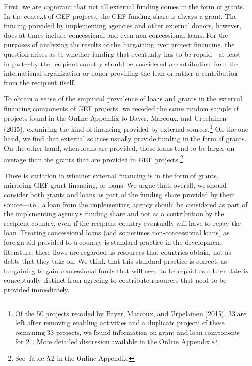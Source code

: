 \documentclass{article}
\begin{document}
First, we are cognizant that not all external funding comes in the form of grants. In the context of GEF projects, the GEF funding share is always a grant. The funding provided by implementing agencies and other external donors, however, does at times include concessional and even non-concessional loans. For the purposes of analyzing the results of the bargaining over project financing, the question arises as to whether funding that eventually has to be repaid---at least in part---by the recipient country should be considered a contribution from the international organization or donor providing the loan or rather a contribution from the recipient itself.
 
To obtain a sense of the empirical prevalence of loans and grants in the external financing components of GEF projects, we recoded the same random sample of projects found in the Online Appendix to Bayer, Marcoux, and Urpelainen (2015), examining the kind of financing provided by external sources.\footnote{Of the 50 projects recoded by Bayer, Marcoux, and Urpelainen (2015), 33 are left after removing enabling activities and a duplicate project; of these remaining 33 projects, we found information on grant and loan components for 21. More detailed discussion available in the Online Appendix.}  On the one hand, we find that external sources usually provide funding in the form of grants. On the other hand, when loans are provided, those loans tend to be larger on average than the grants that are provided in GEF projects.\footnote{See Table A2 in the Online Appendix.}
  
There is variation in whether external financing is in the form of grants, mirroring GEF grant financing, or loans.  We argue that, overall, we should consider both grants and loans as part of the funding share provided by their source---i.e., a loan from the implementing agency should be considered as part of the implementing agency’s funding share and not as a contribution by the recipient country, even if the recipient country eventually will have to repay the loan.  Treating concessional loans (and sometimes non-concessional loans) as foreign aid provided to a country is standard practice in the development literature: these flows are regarded as resources that countries obtain, not as debts that they take on.  We think that this standard practice is correct, as bargaining to gain concessional funds that will need to be repaid as a later date is conceptually distinct from agreeing to contribute resources that need to be provided immediately. 
\end{document}
